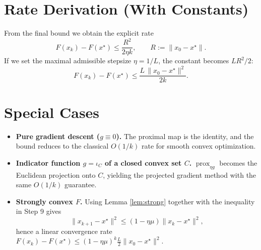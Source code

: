 \documentclass{article}
\newcommand{\prox}{\operatorname{prox}}
\begin{document}
\section*{Rate Derivation (With Constants)}
From the final bound we obtain the explicit rate
\[
F(x_{k})-F(x^{\star})\le \frac{R^{2}}{2\eta k},
\qquad R:=\|x_{0}-x^{\star}\|.
\]
If we set the maximal admissible stepsize $\eta=1/L$, the constant becomes $L R^{2}/2$:
\[
F(x_{k})-F(x^{\star})\le \frac{L\,\|x_{0}-x^{\star}\|^{2}}{2k}.
\]

\section*{Special Cases}
\begin{itemize}
\item \textbf{Pure gradient descent ($g\equiv0$).}  The proximal map is the identity, and the bound reduces to the classical $O(1/k)$ rate for smooth convex optimization.
\item \textbf{Indicator function $g=\iota_{C}$ of a closed convex set $C$.}  $\prox_{\eta g}$ becomes the Euclidean projection onto $C$, yielding the projected gradient method with the same $O(1/k)$ guarantee.
\item \textbf{Strongly convex $F$.}  Using Lemma \ref{lem:strong} together with the inequality in Step 9 gives
\[
\|x_{k+1}-x^{\star}\|^{2}\le (1-\eta\mu)\|x_{k}-x^{\star}\|^{2},
\]
hence a linear convergence rate $F(x_{k})-F(x^{\star})\le (1-\eta\mu)^{k}\frac{L}{2}\|x_{0}-x^{\star}\|^{2}$.
\end{itemize}
\end{document}
